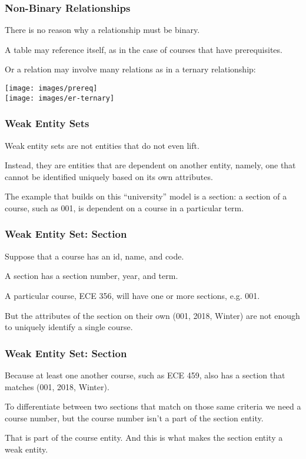 \begin{frame}
\frametitle{Non-Binary Relationships}

There is no reason why a relationship must be binary.

A table may reference itself, as in the case of courses that have prerequisites.

Or a relation may involve many relations as in a ternary relationship:

\begin{center}
\texttt{[image: images/prereq]}\\
\texttt{[image: images/er-ternary]}
\end{center}

\end{frame}



\begin{frame}
\frametitle{Weak Entity Sets}

Weak entity sets are not entities that do not even lift. 

Instead, they are entities that are dependent on another entity, namely, one that cannot be identified uniquely based on its own attributes. 

The example that builds on this ``university'' model is a section: a section of a course, such as 001, is dependent on a course in a particular term. 

\end{frame}


\begin{frame}
\frametitle{Weak Entity Set: Section}

Suppose that a course has an id, name, and code. 

A section has a section number, year, and term. 

A particular course, ECE 356, will have one or more sections, e.g. 001. 

But the attributes of the section on their own (001, 2018, Winter) are not enough to uniquely identify a single course. 

\end{frame}

\begin{frame}
\frametitle{Weak Entity Set: Section}

Because at least one another course, such as ECE 459, also has a section that matches (001, 2018, Winter). 

To differentiate between two sections that match on those same criteria we need a course number, but the course number isn't a part of the section entity. 

That is part of the course entity. And this is what makes the section entity a weak entity.

\end{frame}



